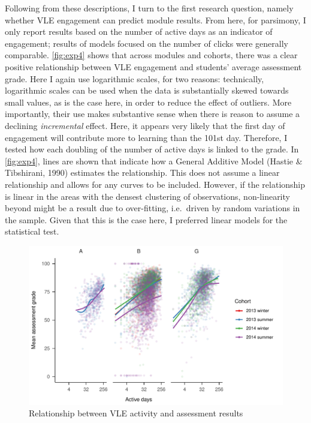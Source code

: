 \documentclass[
  english,
  man,mask,floatsintext]{apa6}
\begin{document}
Following from these descriptions, I turn to the first research question, namely whether VLE engagement can predict module results. From here, for parsimony, I only report results based on the number of active days as an indicator of engagement; results of models focused on the number of clicks were generally comparable. \autoref{fig:exp4} shows that across modules and cohorts, there was a clear positive relationship between VLE engagement and students' average assessment grade. Here I again use logarithmic scales, for two reasons: technically, logarithmic scales can be used when the data is substantially skewed towards small values, as is the case here, in order to reduce the effect of outliers. More importantly, their use makes substantive sense when there is reason to assume a declining \emph{incremental} effect. Here, it appears very likely that the first day of engagement will contribute more to learning than the 101st day. Therefore, I tested how each doubling of the number of active days is linked to the grade. In \autoref{fig:exp4}, lines are shown that indicate how a General Additive Model (Hastie \& Tibshirani, 1990) estimates the relationship. This does not assume a linear relationship and allows for any curves to be included. However, if the relationship is linear in the areas with the densest clustering of observations, non-linearity beyond might be a result due to over-fitting, i.e.~driven by random variations in the sample. Given that this is the case here, I preferred linear models for the statistical test.

\begin{figure}
\centering
\includegraphics{Assigment-2---OU-data_files/figure-latex/unnamed-chunk-5-1.pdf}
\caption{\label{fig:unnamed-chunk-5}Relationship between VLE activity and assessment results \label{fig:exp4}}
\end{figure}
\end{document}
